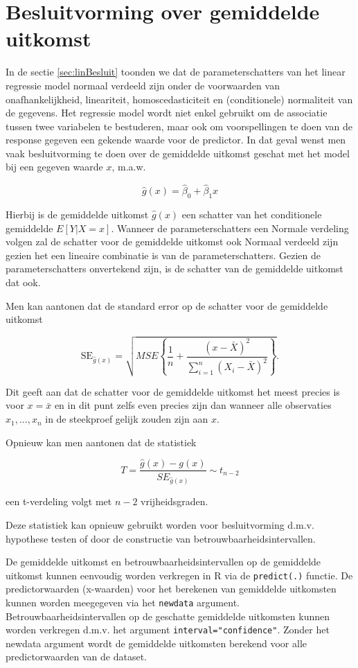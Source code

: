 \documentclass[
  12pt,dutch,coursenotes]{book}
\newcommand{\passthrough}[1]{#1}
\begin{document}
\hypertarget{besluitvorming-over-gemiddelde-uitkomst}{%
\section{Besluitvorming over gemiddelde uitkomst}\label{besluitvorming-over-gemiddelde-uitkomst}}

In de sectie \ref{sec:linBesluit} toonden we dat de parameterschatters van het linear regressie model normaal verdeeld zijn onder de voorwaarden van onafhankelijkheid, lineariteit, homoscedasticiteit en (conditionele) normaliteit van de gegevens.
Het regressie model wordt niet enkel gebruikt om de associatie tussen twee variabelen te bestuderen, maar ook om voorspellingen te doen van de response gegeven een gekende waarde voor de predictor.
In dat geval wenst men vaak besluitvorming te doen over de gemiddelde uitkomst geschat met het model bij een gegeven waarde \(x\), m.a.w.

\[\hat{g}(x)= \hat{\beta}_0 + \hat{\beta}_1 x\]

Hierbij is de gemiddelde uitkomst \(\hat{g}(x)\) een schatter van het conditionele gemiddelde \(E[Y\vert X=x]\).
Wanneer de parameterschatters een Normale verdeling volgen zal de schatter voor de gemiddelde uitkomst ook Normaal verdeeld zijn gezien het een lineaire combinatie is van de parameterschatters.
Gezien de parameterschatters onvertekend zijn, is de schatter van de gemiddelde uitkomst dat ook.

Men kan aantonen dat de standard error op de schatter voor de gemiddelde uitkomst

\[\text{SE}_{\hat{g}(x)}=\sqrt{MSE\left\{\frac{1}{n}+\frac{(x-\bar X)^2}{\sum\limits_{i=1}^n (X_i-\bar X)^2}\right\}}.\]

Dit geeft aan dat de schatter voor de gemiddelde uitkomst het meest precies is voor \(x=\bar x\) en in dit punt zelfs even precies zijn dan wanneer alle observaties \(x_1,\ldots, x_n\) in de steekproef gelijk zouden zijn aan \(x\).

Opnieuw kan men aantonen dat de statistiek

\[T=\frac{\hat{g}(x)-g(x)}{SE_{\hat{g}(x)}}\sim t_{n-2}\]

een t-verdeling volgt met \(n-2\) vrijheidsgraden.

Deze statistiek kan opnieuw gebruikt worden voor besluitvorming d.m.v. hypothese testen of door de constructie van betrouwbaarheidsintervallen.

De gemiddelde uitkomst en betrouwbaarheidsintervallen op de gemiddelde uitkomst kunnen eenvoudig worden verkregen in R via de \passthrough{\lstinline!predict(.)!} functie.
De predictorwaarden (x-waarden) voor het berekenen van gemiddelde uitkomsten kunnen worden meegegeven via het \passthrough{\lstinline!newdata!} argument.
Betrouwbaarheidsintervallen op de geschatte gemiddelde uitkomsten kunnen worden verkregen d.m.v. het argument \passthrough{\lstinline!interval="confidence"!}.
Zonder het newdata argument wordt de gemiddelde uitkomsten berekend voor alle predictorwaarden van de dataset.
\end{document}
